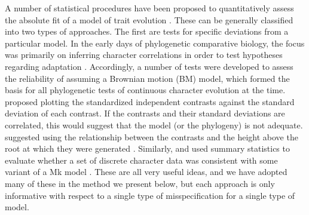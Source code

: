 A number of statistical procedures have been proposed to quantitatively assess the absolute fit of a model of trait evolution \citep[e.g.,][]{Garland1992, Garland1993, Purvis1995, Diaz1996, FreckletonHarvey2006, Boettiger2012, SlaterPennell, Beaulieu2013, Blackmon2014}. These can be generally classified into two types of approaches. The first are tests for specific deviations from a particular model.
In the early days of phylogenetic comparative biology, the focus was primarily on inferring character correlations in order to test hypotheses regarding adaptation \citep[e.g.,][]{Felsenstein1985, Grafen1989, HarveyPagel1991, Lynch1991}. Accordingly, a number of tests were developed to assess the reliability of assuming a Brownian motion (BM) model, which formed the basis for all phylogenetic tests of continuous character evolution at the time. \citet{Garland1992} proposed plotting the standardized independent contrasts \citep[\emph{sensu}][]{Felsenstein1985} against the standard deviation of each contrast. If the contrasts and their standard deviations are correlated, this would suggest that the model (or the phylogeny) is not adequate. 
\citet{Purvis1995} suggested using the relationship between the contrasts and the height above the root at which they were generated \citep[see also][for a slight modification of this test]{FreckletonHarvey2006}. Similarly, \citet{Beaulieu2013} and \citet{Blackmon2014} used summary statistics to evaluate whether a set of discrete character data was consistent with some variant of a Mk model \citep{Pagel1994}. These are all very useful ideas, and we have adopted many of these in the method we present below, but each approach is only informative with respect to a single type of misspecification for a single type of model.

